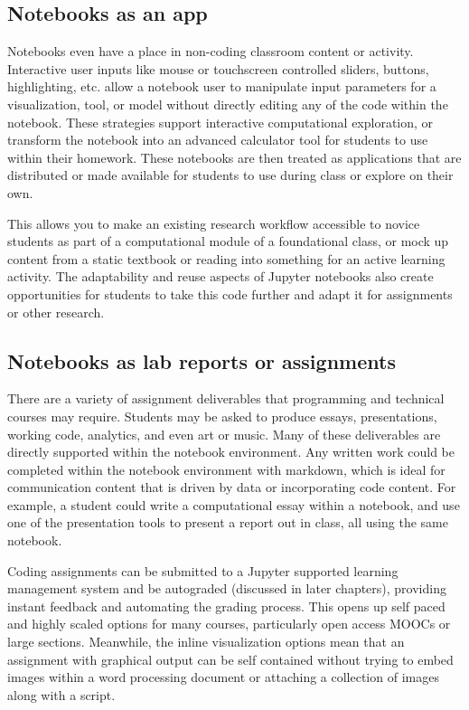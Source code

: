 \documentclass[]{book}
\begin{document}
\hypertarget{notebooks-as-an-app}{%
\subsection{Notebooks as an app}\label{notebooks-as-an-app}}

Notebooks even have a place in non-coding classroom content or activity.
Interactive user inputs like mouse or touchscreen controlled sliders, buttons,
highlighting, etc. allow a notebook user to manipulate input parameters for a
visualization, tool, or model without directly editing any of the code within
the notebook. These strategies support interactive computational exploration, or
transform the notebook into an advanced calculator tool for students to use
within their homework. These notebooks are then treated as applications that are
distributed or made available for students to use during class or explore on
their own.

This allows you to make an existing research workflow accessible to novice
students as part of a computational module of a foundational class, or mock up
content from a static textbook or reading into something for an active learning
activity. The adaptability and reuse aspects of Jupyter notebooks also create
opportunities for students to take this code further and adapt it for
assignments or other research.

\hypertarget{notebooks-as-lab-reports-or-assignments}{%
\subsection{Notebooks as lab reports or assignments}\label{notebooks-as-lab-reports-or-assignments}}

There are a variety of assignment deliverables that programming and technical
courses may require. Students may be asked to produce essays, presentations,
working code, analytics, and even art or music. Many of these deliverables are
directly supported within the notebook environment. Any written work could be
completed within the notebook environment with markdown, which is ideal for
communication content that is driven by data or incorporating code content. For
example, a student could write a computational essay within a notebook, and use
one of the presentation tools to present a report out in class, all using the
same notebook.

Coding assignments can be submitted to a Jupyter supported learning management
system and be autograded (discussed in later chapters), providing instant
feedback and automating the grading process. This opens up self paced and
highly scaled options for many courses, particularly open access MOOCs or large
sections. Meanwhile, the inline visualization options mean that an assignment
with graphical output can be self contained without trying to embed images
within a word processing document or attaching a collection of images along with
a script.
\end{document}
